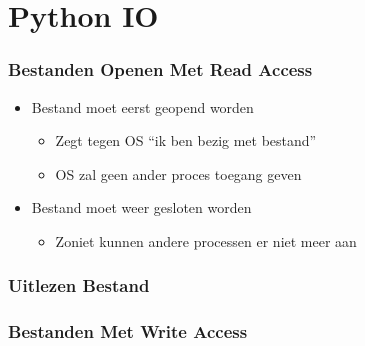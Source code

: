 \section{Python IO}

\frame{\tableofcontents[currentsection]}

\begin{frame}
  \frametitle{Bestanden Openen Met Read Access}
  \begin{overprint}

  \end{overprint}
  \begin{itemize}
    \item Bestand moet eerst geopend worden
          \begin{itemize}
            \item Zegt tegen OS ``ik ben bezig met bestand''
            \item OS zal geen ander proces toegang geven
          \end{itemize}
    \item Bestand moet weer gesloten worden
          \begin{itemize}
            \item Zoniet kunnen andere processen er niet meer aan
          \end{itemize}
  \end{itemize}
\end{frame}

\begin{frame}
  \frametitle{Uitlezen Bestand}
\end{frame}

\begin{frame}
  \frametitle{Bestanden Met Write Access}
\end{frame}



